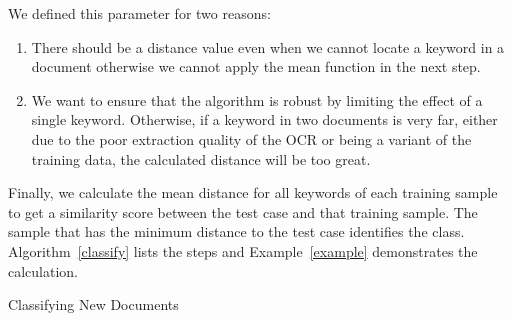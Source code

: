We defined this parameter for two reasons:
\begin{enumerate}
\item There should be a distance value even when we cannot locate a keyword in a document otherwise we cannot apply the mean function in the next step.
\item We want to ensure that the algorithm is robust by limiting the effect of a single keyword. Otherwise, if a keyword in two documents is very far, either due to the poor extraction quality of the OCR or being a variant of the training data, the calculated distance will be too great.
\end{enumerate}

Finally, we calculate the mean distance for all keywords of each training sample to get a similarity score between the test case and that training sample. The sample that has the minimum distance to the test case identifies the class. Algorithm~\ref{classify} lists the steps and Example~\ref{example} demonstrates the calculation.
\IncMargin{1.5em}
\begin{algorithm}[t!]
\BlankLine
{}
\caption{Classifying New Documents\label{classify}}
\end{algorithm}
\DecMargin{1.5em}

